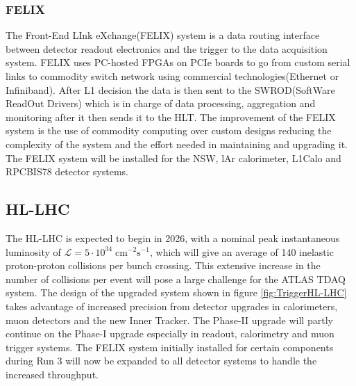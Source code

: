 \subsubsection{FELIX}

The Front-End LInk eXchange(FELIX) system is a data routing interface between detector readout electronics and the trigger to the data acquisition system. FELIX uses PC-hosted FPGAs on PCIe boards to go from custom serial links to commodity switch network using commercial technologies(Ethernet or Infiniband). After L1 decision the data is then sent to the SWROD(SoftWare ReadOut Drivers) which is in charge of data processing, aggregation and monitoring after it then sends it to the HLT. The improvement of the FELIX system is the use of commodity computing over custom designs reducing the complexity of the system and the effort needed in maintaining and upgrading it. The FELIX system will be installed for the NSW, lAr calorimeter, L1Calo and RPCBIS78 detector systems.

\subsection{HL-LHC}

The HL-LHC is expected to begin in 2026, with a nominal peak instantaneous luminosity of $\mathcal{L}= 5 \cdot 10^{34} \; \text{cm}^{-2}\text{s}^{-1}$, which will give an average of 140 inelastic proton-proton collisions per bunch crossing. This extensive increase in the number of collisions per event will pose a large challenge for the ATLAS TDAQ system. The design of the upgraded system shown in figure \ref{fig:TriggerHL-LHC} takes advantage of increased precision from detector upgrades in calorimeters, muon detectors and the new Inner Tracker. The Phase-II upgrade will partly continue on the Phase-I upgrade especially in readout, calorimetry and muon trigger systems. The FELIX system initially installed for certain components during Run 3 will now be expanded to all detector systems to handle the increased throughput.

